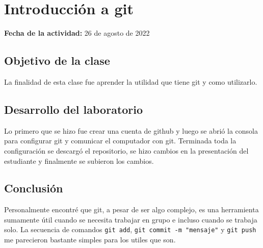 \documentclass[../portafolio.tex]{subfiles}
\begin{document}


\section{Introducción a git}   %

\hfill \textbf{Fecha de la actividad:} 26 de agosto de 2022

\medskip

\subsection{Objetivo de la clase}
La finalidad de esta clase fue aprender la utilidad que tiene git y como utilizarlo.

\subsection{Desarrollo del laboratorio}
Lo primero que se hizo fue crear una cuenta de github y luego se abrió la consola para configurar git y comunicar el computador con git. Terminada toda la configuración se descargó el repositorio, se hizo cambios en la presentación del estudiante y finalmente se subieron los cambios.

\subsection{Conclusión}
Personalmente encontré que git, a pesar de ser algo complejo, es una herramienta sumamente útil cuando se necesita trabajar en grupo e incluso cuando se trabaja solo. La secuencia de comandos \texttt{git add}, \texttt{git commit -m "mensaje"} y \texttt{git push} me parecieron bastante simples para los utiles que son.
\end{document}
